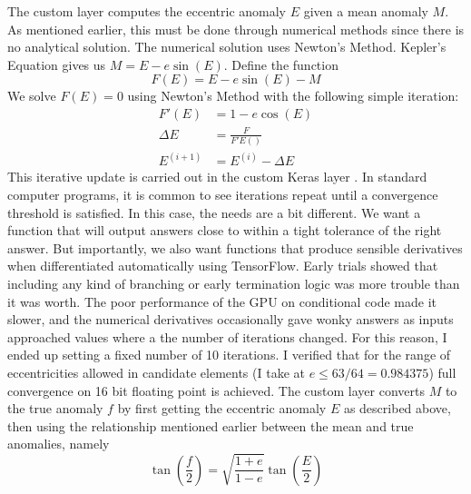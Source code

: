 The custom layer  computes the eccentric anomaly $E$ given a mean anomaly $M$.
As mentioned earlier, this must be done through numerical methods since there is no analytical solution.
The numerical solution uses Newton's Method.
Kepler's Equation gives us $M = E - e \sin(E)$.
Define the function
$$F(E) = E - e \sin(E) - M$$
We solve $F(E) = 0 $ using Newton's Method with the following simple iteration:
\begin{align*}
F'(E) &= 1 - e \cos(E) \\
\Delta E &= \frac{F}{F'E()} \\
E^{(i+1)} &= E^{(i)} - \Delta E
\end{align*}
This iterative update is carried out in the custom Keras layer .
In standard computer programs, it is common to see iterations repeat until a convergence threshold is satisfied.
In this case, the needs are a bit different.
We want a function that will output answers close to within a tight tolerance of the right answer.
But importantly, we also want functions that produce sensible derivatives when differentiated automatically using TensorFlow.
Early trials showed that including any kind of branching or early termination logic was more trouble than it was worth.
The poor performance of the GPU on conditional code made it slower, 
and the numerical derivatives occasionally gave wonky answers as inputs approached values where a the number of iterations changed.
For this reason, I ended up setting a fixed number of 10 iterations.
I verified that for the range of eccentricities allowed in candidate elements (I take at $ e \le 63/64 = 0.984375$) 
full convergence on 16 bit floating point is achieved.
The custom layer  converts $M$ to the true anomaly $f$ by first getting the eccentric anomaly $E$
as described above, then using the relationship mentioned earlier between the mean and true anomalies, namely
$$ \tan \left(\frac{f}{2} \right) = \sqrt{\frac{1+e}{1-e}} \tan \left( \frac{E}{2} \right)$$

